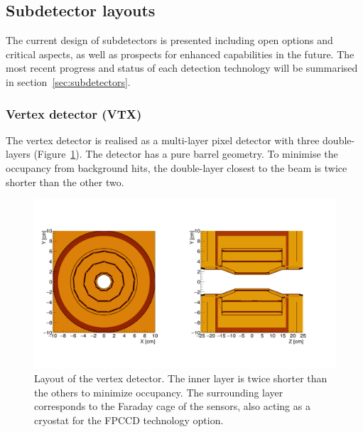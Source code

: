 

\subsection{Subdetector layouts}
\label{ref:subsec:subdetectors}

The current design of subdetectors is presented including open options and critical aspects, as well as prospects for enhanced capabilities in the future. The most recent progress and status of each detection technology will be summarised in section~\ref{sec:subdetectors}.

\subsubsection{Vertex detector (VTX)}

The vertex detector is realised as a multi-layer pixel detector with three double-layers (Figure~\ref{fig:det:vertex}). The detector has a pure barrel geometry. To minimise the occupancy from background hits,
the double-layer closest to the beam is twice shorter than the other two. 

\begin{figure}[t!]
\centering
\includegraphics[width=0.9\hsize]{Detector/fig/vertex.png}
\caption{Layout of the vertex detector. The inner layer is twice shorter than the others to minimize occupancy. The surrounding layer corresponds to the Faraday cage of the sensors, also acting as a cryostat for the FPCCD technology option.}
\label{fig:det:vertex}
\end{figure}

